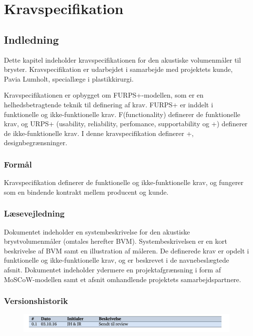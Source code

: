 
\chapter{Kravspecifikation}
\label{Kravspec}
	\section{Indledning}
	Dette kapitel indeholder kravspecifikationen for den akustiske volumenmåler til bryster. Kravspecifikation er udarbejdet i samarbejde med projektets kunde, Pavia Lumholt, speciallæge i plastikkirurgi. 
	
	Kravspecifikationen er opbygget om FURPS+-modellen, som er en helhedsbetragtende teknik til definering af krav.
	FURPS+ er inddelt i funktionelle og ikke-funktionelle krav. F(functionality) definerer de funktionelle krav, og URPS+ (usability, reliability, perfomance, supportability og +) definerer de ikke-funktionelle krav. I denne kravspecifikation definerer +, designbegrænsninger.  
		  
		\subsection{Formål}
		Kravspecifikation definerer de funktionelle og ikke-funktionelle krav, og fungerer som en bindende kontrakt mellem producent og kunde.
	
		\subsection{Læsevejledning}	
		Dokumentet indeholder en systembeskrivelse for den akustiske brystvolumenmåler (omtales herefter BVM). Systembeskrivelsen er en kort beskrivelse af BVM samt en illustration af måleren. De definerede krav er opdelt i funktionelle og ikke-funktionelle krav, og er beskrevet i de navnebeslægtede afsnit. Dokumentet indeholder ydermere en projektafgrænsning i form af MoSCoW-modellen samt et afsnit omhandlende projektets samarbejdspartnere.
		
		\subsection{Versionshistorik}
		
		\vspace{5mm}
		
			\begin{figure}[htb]
				\centering
				\includegraphics[width=5in]{versionshisv01.png}
			\end{figure}
		
